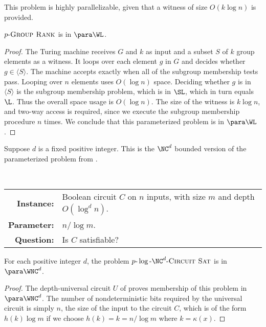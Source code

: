 \documentclass{article}
\newcommand{\dash}{\textnormal{-}}
\newcommand{\pncsat}{p\dash\log\dash\NC^d\dash\textsc{Circuit Sat}}
\newcommand{\pgrouprank}{p\dash\textsc{Group Rank}}
\newcommand{\gen}[1]{\langle#1\rangle}
\begin{document}
This problem is highly parallelizable, given that a witness of size $O(k \log n)$ is provided.

\begin{theorem}\label{thm:pgrouprank}
  $\pgrouprank$ is in $\para \WL$.
\end{theorem}
\begin{proof}
  The Turing machine receives $G$ and $k$ as input and a subset $S$ of $k$ group elements as a witness.
  It loops over each element $g$ in $G$ and decides whether $g \in \gen{S}$.
  The machine accepts exactly when all of the subgroup membership tests pass.
  Looping over $n$ elements uses $O(\log n)$ space.
  Deciding whether $g$ is in $\gen{S}$ is the subgroup membership problem, which is in $\SL$, which in turn equals $\L$.
  Thus the overall space usage is $O(\log n)$.
  The size of the witness is $k \log n$, and two-way access is required, since we execute the subgroup membership procedure $n$ times.
  We conclude that this parameterized problem is in $\para \WL$.
\end{proof}

Suppose $d$ is a fixed positive integer.
This is the $\NC^d$ bounded version of the parameterized problem from \autocite[Lemma~3.26]{fg06}.

\begin{definition}[$\pncsat$]
  \mbox{} \\
  \begin{tabular}{r p{9.2cm}}
    \textbf{Instance:} & Boolean circuit $C$ on $n$ inputs, with size $m$ and depth $O(\log^d n)$. \\
    \textbf{Parameter:} & $n / \log m$. \\
    \textbf{Question:} & Is $C$ satisfiable?
  \end{tabular}
\end{definition}

\begin{lemma}\label{lem:pncsat}
  For each positive integer $d$, the problem $\pncsat$ is in $\para \WNC^d$.
\end{lemma}
\begin{proof}
  The depth-universal circuit $U$ of \autocite{ch85} proves membership of this problem in $\para \WNC^d$.
  The number of nondeterministic bits required by the universal circuit is simply $n$, the size of the input to the circuit $C$, which is of the form $h(k) \log m$ if we choose $h(k) = k = n / \log m$ where $k = \kappa(x)$.
\end{proof}
\end{document}
